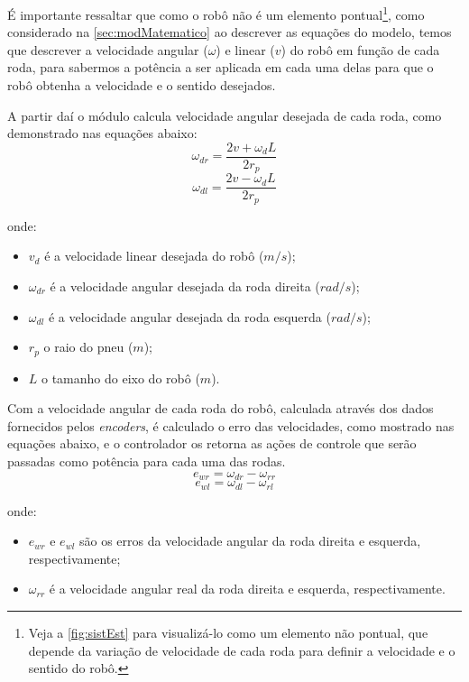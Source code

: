 É importante ressaltar que como o robô não é um elemento pontual\footnote{Veja a \autoref{fig:sistEst} para visualizá-lo como um elemento não pontual, que depende da variação de velocidade de cada roda para definir a velocidade e o sentido do robô.}, como considerado na \autoref{sec:modMatematico} ao descrever as equações do modelo, temos que descrever a velocidade angular (\emph{$\omega$}) e linear (\emph{$v$}) do robô em função de cada roda, para sabermos a potência a ser aplicada em cada uma delas para que o robô obtenha a velocidade e o sentido desejados.

A partir daí o módulo calcula velocidade angular desejada de cada roda, como demonstrado nas equações abaixo:
\begin{equation}
\omega_{dr} = \dfrac{2v + \omega_{d}L}{2r_{p}}	
\label{eq:velocangulardireita}
\end{equation} 
\begin{equation}
\omega_{dl} = \dfrac{2v - \omega_{d}L}{2r_{p}}	
\label{eq:velocangularesquerda}
\end{equation} 

onde:
\begin{itemize}
	\item $v_d$ é a velocidade linear desejada do robô ($m/s$);
	\item $\omega_{dr}$ é a velocidade angular desejada da roda direita ($rad/s$);
	\item $\omega_{dl}$ é a velocidade angular desejada da roda esquerda ($rad/s$);
	\item $r_{p}$ o raio do pneu ($m$);
	\item $L$ o tamanho do eixo do robô ($m$).	
\end{itemize}

Com a velocidade angular de cada roda  do robô, calculada através dos dados fornecidos pelos \emph{encoders}, é calculado o erro das velocidades, como mostrado nas equações abaixo, e o controlador os retorna as ações de controle que serão passadas como potência para cada uma das rodas.
\begin{equation}
e_{wr} = \omega_{dr} - \omega_{rr}
\label{eq:errVelAngDireita}
\end{equation} 
\begin{equation}
e_{wl} = \omega_{dl} - \omega_{rl}
\label{eq:errVelAngEsquerda}
\end{equation} 

onde:
\begin{itemize}
	\item $e_{wr}$ e $e_{wl}$ são os erros da velocidade angular da roda direita e esquerda, respectivamente;
	\item $\omega_{rr}$ é a velocidade angular real da roda direita e esquerda, respectivamente.
\end{itemize}	

